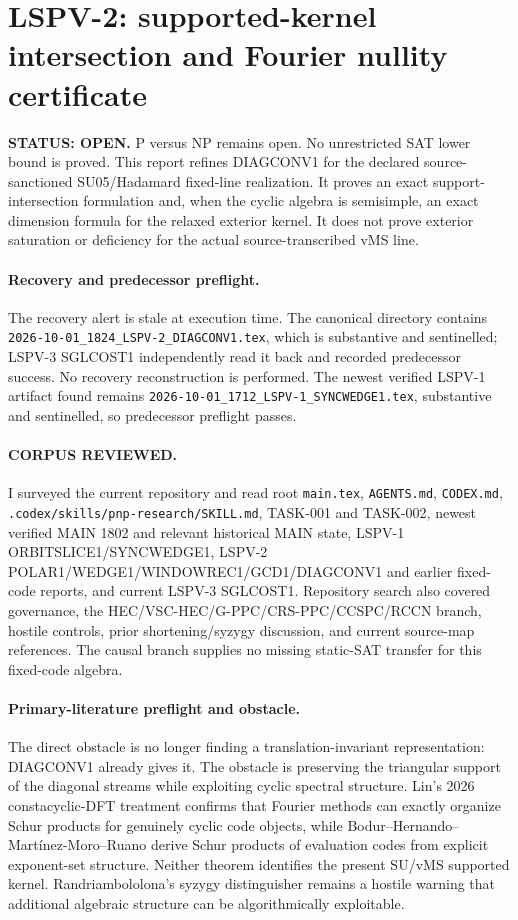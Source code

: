 \documentclass[11pt]{article}
\begin{document}
\section*{LSPV-2: supported-kernel intersection and Fourier nullity certificate}

\textbf{STATUS: OPEN.} P versus NP remains open. No unrestricted SAT lower bound is proved. This report refines DIAGCONV1 for the declared source-sanctioned SU05/Hadamard fixed-line realization. It proves an exact support-intersection formulation and, when the cyclic algebra is semisimple, an exact dimension formula for the relaxed exterior kernel. It does not prove exterior saturation or deficiency for the actual source-transcribed vMS line.

\paragraph{Recovery and predecessor preflight.}
The recovery alert is stale at execution time. The canonical directory contains \texttt{2026-10-01\_1824\_LSPV-2\_DIAGCONV1.tex}, which is substantive and sentinelled; LSPV-3 SGLCOST1 independently read it back and recorded predecessor success. No recovery reconstruction is performed. The newest verified LSPV-1 artifact found remains \texttt{2026-10-01\_1712\_LSPV-1\_SYNCWEDGE1.tex}, substantive and sentinelled, so predecessor preflight passes.

\paragraph{CORPUS REVIEWED.}
I surveyed the current repository and read root \texttt{main.tex}, \texttt{AGENTS.md}, \texttt{CODEX.md}, \texttt{.codex/skills/pnp-research/SKILL.md}, TASK-001 and TASK-002, newest verified MAIN 1802 and relevant historical MAIN state, LSPV-1 ORBITSLICE1/SYNCWEDGE1, LSPV-2 POLAR1/WEDGE1/WINDOWREC1/GCD1/DIAGCONV1 and earlier fixed-code reports, and current LSPV-3 SGLCOST1. Repository search also covered governance, the HEC/VSC-HEC/G-PPC/CRS-PPC/CCSPC/RCCN branch, hostile controls, prior shortening/syzygy discussion, and current source-map references. The causal branch supplies no missing static-SAT transfer for this fixed-code algebra.

\paragraph{Primary-literature preflight and obstacle.}
The direct obstacle is no longer finding a translation-invariant representation: DIAGCONV1 already gives it. The obstacle is preserving the triangular support of the diagonal streams while exploiting cyclic spectral structure. Lin's 2026 constacyclic-DFT treatment confirms that Fourier methods can exactly organize Schur products for genuinely cyclic code objects, while Bodur--Hernando--Mart\'inez-Moro--Ruano derive Schur products of evaluation codes from explicit exponent-set structure. Neither theorem identifies the present SU/vMS supported kernel. Randriambololona's syzygy distinguisher remains a hostile warning that additional algebraic structure can be algorithmically exploitable.
\end{document}
